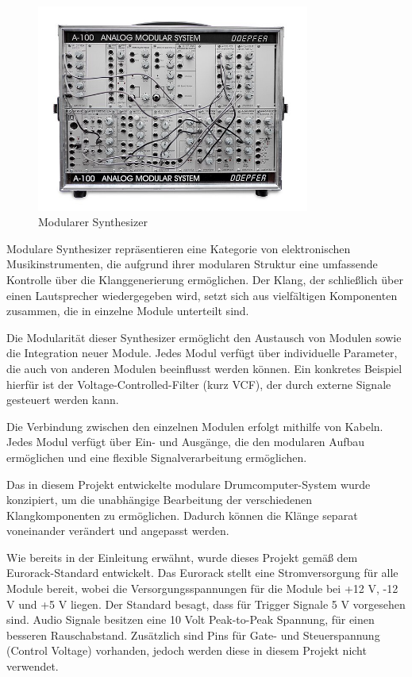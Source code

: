 \begin{figure}[H]
    \centering
    \includegraphics[width=0.8\textwidth]{Images/Modularer Synthesizer.jpg}
    \caption[Modularer Synthesizer]{Modularer Synthesizer \cite{wiki_eurorack}}
    \label{fig:Modularer Synthesizer}
\end{figure}

Modulare Synthesizer repräsentieren eine Kategorie von elektronischen Musikinstrumenten, die aufgrund ihrer modularen Struktur eine umfassende Kontrolle über die Klanggenerierung ermöglichen. Der Klang, der schließlich über einen Lautsprecher wiedergegeben wird, setzt sich aus vielfältigen Komponenten zusammen, die in einzelne Module unterteilt sind. 


Die Modularität dieser Synthesizer ermöglicht den Austausch von Modulen sowie die Integration neuer Module. Jedes Modul verfügt über individuelle Parameter, die auch von anderen Modulen beeinflusst werden können. Ein konkretes Beispiel hierfür ist der Voltage-Controlled-Filter (kurz VCF), der durch externe Signale gesteuert werden kann.

Die Verbindung zwischen den einzelnen Modulen erfolgt mithilfe von Kabeln. Jedes Modul verfügt über Ein- und Ausgänge, die den modularen Aufbau ermöglichen und eine flexible Signalverarbeitung ermöglichen.

Das in diesem Projekt entwickelte modulare Drumcomputer-System wurde konzipiert, um die unabhängige Bearbeitung der verschiedenen Klangkomponenten zu ermöglichen. Dadurch können die Klänge separat voneinander verändert und angepasst werden.

Wie bereits in der Einleitung erwähnt, wurde dieses Projekt gemäß dem Eurorack-Standard entwickelt. Das Eurorack stellt eine Stromversorgung für alle Module bereit, wobei die Versorgungsspannungen für die Module bei +12 V, -12 V und +5 V liegen. Der Standard besagt, dass für Trigger Signale 5 V vorgesehen sind. Audio Signale besitzen eine 10 Volt Peak-to-Peak Spannung, für einen besseren Rauschabstand. Zusätzlich sind Pins für Gate- und Steuerspannung (Control Voltage) vorhanden, jedoch werden diese in diesem Projekt nicht verwendet.

